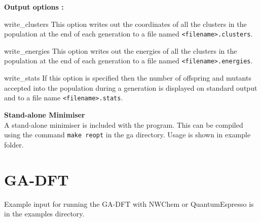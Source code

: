\documentclass[12pt,a4paper]{article}
\newenvironment{entry}[1]
{\begin{list}{}{\renewcommand{\makelabel}[1]{~~\texttt{##1 :}\hfil}
      \setlength{\labelwidth}{90pt}
      \setlength{\leftmargin}{\labelwidth+\labelsep}}}
{\end{list}}
\begin{document}
\noindent \textbf{Output options :} ~\\ [1ex]
\begin{entry}{a}
\item[write\_clusters] This option writes out the coordinates of all the clusters in the population at the end of each generation to a file named \texttt{<filename>.clusters}.
\item[write\_energies] This option writes out the energies of all the clusters in the population at the end of each generation to a file named \texttt{<filename>.energies}.  
\item[write\_stats] If this option is specified then the number of offspring and mutants accepted into the population during a generation is displayed on standard output and to a file name \texttt{<filename>.stats}.
\end{entry}

\noindent \textbf{Stand-alone Minimiser} ~\\ [1ex]
A stand-alone minimiser is included with the program. This can be compiled using the command \texttt{make reopt} in the ga directory. Usage is shown in example folder.

\section{GA-DFT}
Example input for running the GA-DFT with NWChem or QuantumEspresso is in the
examples directory.
\end{document}
